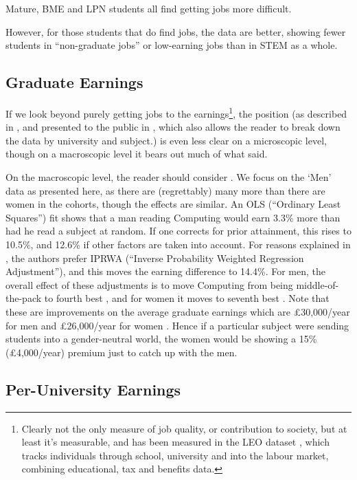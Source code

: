 \documentclass[sigconf,anonymous]{acmart}
\begin{document}
Mature, BME and LPN students all find getting jobs more difficult.
\par However, for those students that do find jobs, the data are
better, showing \cite[Figure 6]{Shadbolt2016a} fewer students in
``non-graduate jobs'' or low-earning jobs than in STEM as a whole.

\subsection{Graduate Earnings}
If we look beyond purely getting jobs to the earnings\footnote{Clearly
not the only measure of job quality, or contribution to society, but
at least it's measurable, and has been measured in the LEO dataset
\cite{DfE2017a}, which tracks individuals through school, university
and into the labour market, combining educational, tax and benefits
data.}, the position (as described in \cite{DfE2018d}, and presented
to the public in \cite{BBC2018f}, which also allows the reader to
break down the data by university and subject.) is even less clear on
a microscopic level, though on a macroscopic level it bears out much
of what \cite{Shadbolt2016a} said.

On the macroscopic level, the reader should consider \cite[Table
5]{DfE2018d}. We focus on the `Men' data as presented here, as there
are (regrettably) many more than there are women in the cohorts,
though the effects are similar. An OLS (``Ordinary
Least Squares'') fit shows that a man reading Computing would earn
3.3\% more than had he read a subject at random. If one corrects for
prior attainment, this rises to 10.5\%, and 12.6\% if other factors
are taken into account. For reasons explained in
\cite[\S4.2]{DfE2018d}, the authors prefer IPRWA (``Inverse
Probability Weighted Regression Adjustment''), and this moves the
earning difference to 14.4\%. For men, the overall effect of these
adjustments is to move Computing from being middle-of-the-pack
\cite[Figure 15]{DfE2018d} to fourth best \cite[Figure 17]{DfE2018d},
and for women it moves to seventh best \cite[Figure
16]{DfE2018d}. Note that these are improvements on the average
graduate earnings which are \pounds30,000/year for men and
\pounds26,000/year for women \cite[p. 37]{DfE2018d}. Hence if a
particular subject were sending students into a gender-neutral world,
the women would be showing a 15\% (\pounds4,000/year) premium just to
catch up with the men.

\subsection{Per-University Earnings}
\end{document}
